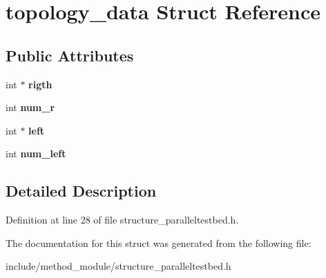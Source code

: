 \hypertarget{structtopology__data}{\section{topology\-\_\-data Struct Reference}
\label{structtopology__data}
}
\subsection*{Public Attributes}
\begin{DoxyCompactItemize}
\item 
\hypertarget{structtopology__data_a9e3de77d56d334112b028da33fceadf8}{int $\ast$ {\bfseries rigth}}\label{structtopology__data_a9e3de77d56d334112b028da33fceadf8}

\item 
\hypertarget{structtopology__data_ae104ea80f9041ccdfe2f484e173668f9}{int {\bfseries num\-\_\-r}}\label{structtopology__data_ae104ea80f9041ccdfe2f484e173668f9}

\item 
\hypertarget{structtopology__data_ac8333579033934687c27b8d86c6495d2}{int $\ast$ {\bfseries left}}\label{structtopology__data_ac8333579033934687c27b8d86c6495d2}

\item 
\hypertarget{structtopology__data_a80e4da66c02bdde726ed543491f5a204}{int {\bfseries num\-\_\-left}}\label{structtopology__data_a80e4da66c02bdde726ed543491f5a204}

\end{DoxyCompactItemize}


\subsection{Detailed Description}


Definition at line 28 of file structure\-\_\-paralleltestbed.\-h.



The documentation for this struct was generated from the following file\-:\begin{DoxyCompactItemize}
\item 
include/method\-\_\-module/structure\-\_\-paralleltestbed.\-h\end{DoxyCompactItemize}
